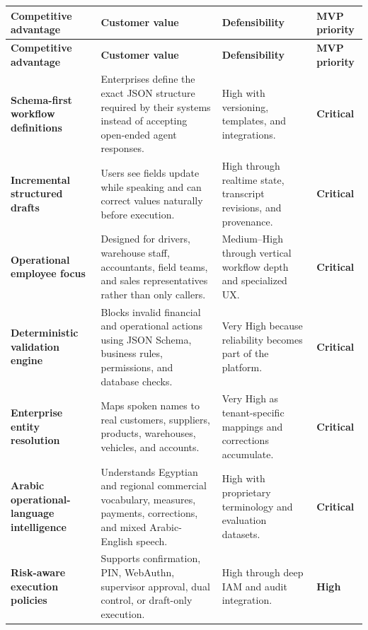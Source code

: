\documentclass[10.5pt,a4paper]{article}
\begin{document}
\small
\begin{longtable}{L{42mm}L{67mm}L{32mm}L{22mm}}
\toprule
\textbf{Competitive advantage} & \textbf{Customer value} & \textbf{Defensibility} & \textbf{MVP priority} \\
\midrule
\endfirsthead

\toprule
\textbf{Competitive advantage} & \textbf{Customer value} & \textbf{Defensibility} & \textbf{MVP priority} \\
\midrule
\endhead

\textbf{Schema-first workflow definitions}
& Enterprises define the exact JSON structure required by their systems instead of accepting open-ended agent responses.
& High with versioning, templates, and integrations.
& \textbf{Critical} \\
\midrule

\textbf{Incremental structured drafts}
& Users see fields update while speaking and can correct values naturally before execution.
& High through realtime state, transcript revisions, and provenance.
& \textbf{Critical} \\
\midrule

\textbf{Operational employee focus}
& Designed for drivers, warehouse staff, accountants, field teams, and sales representatives rather than only callers.
& Medium--High through vertical workflow depth and specialized UX.
& \textbf{Critical} \\
\midrule

\textbf{Deterministic validation engine}
& Blocks invalid financial and operational actions using JSON Schema, business rules, permissions, and database checks.
& Very High because reliability becomes part of the platform.
& \textbf{Critical} \\
\midrule

\textbf{Enterprise entity resolution}
& Maps spoken names to real customers, suppliers, products, warehouses, vehicles, and accounts.
& Very High as tenant-specific mappings and corrections accumulate.
& \textbf{Critical} \\
\midrule

\textbf{Arabic operational-language intelligence}
& Understands Egyptian and regional commercial vocabulary, measures, payments, corrections, and mixed Arabic-English speech.
& High with proprietary terminology and evaluation datasets.
& \textbf{Critical} \\
\midrule

\textbf{Risk-aware execution policies}
& Supports confirmation, PIN, WebAuthn, supervisor approval, dual control, or draft-only execution.
& High through deep IAM and audit integration.
& \textbf{High} \\
\midrule


\end{longtable}
\end{document}

